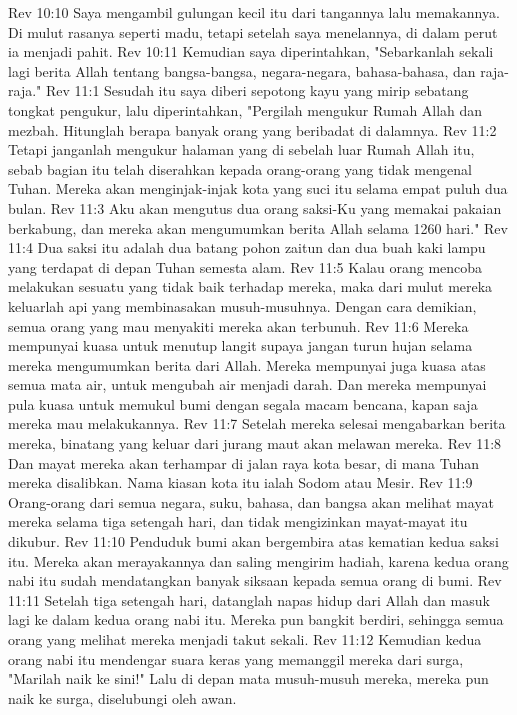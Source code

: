 Rev 10:10  Saya mengambil gulungan kecil itu dari tangannya lalu memakannya. Di mulut rasanya seperti madu, tetapi setelah saya menelannya, di dalam perut ia menjadi pahit.
Rev 10:11  Kemudian saya diperintahkan, "Sebarkanlah sekali lagi berita Allah tentang bangsa-bangsa, negara-negara, bahasa-bahasa, dan raja-raja."
Rev 11:1  Sesudah itu saya diberi sepotong kayu yang mirip sebatang tongkat pengukur, lalu diperintahkan, "Pergilah mengukur Rumah Allah dan mezbah. Hitunglah berapa banyak orang yang beribadat di dalamnya.
Rev 11:2  Tetapi janganlah mengukur halaman yang di sebelah luar Rumah Allah itu, sebab bagian itu telah diserahkan kepada orang-orang yang tidak mengenal Tuhan. Mereka akan menginjak-injak kota yang suci itu selama empat puluh dua bulan.
Rev 11:3  Aku akan mengutus dua orang saksi-Ku yang memakai pakaian berkabung, dan mereka akan mengumumkan berita Allah selama 1260 hari."
Rev 11:4  Dua saksi itu adalah dua batang pohon zaitun dan dua buah kaki lampu yang terdapat di depan Tuhan semesta alam.
Rev 11:5  Kalau orang mencoba melakukan sesuatu yang tidak baik terhadap mereka, maka dari mulut mereka keluarlah api yang membinasakan musuh-musuhnya. Dengan cara demikian, semua orang yang mau menyakiti mereka akan terbunuh.
Rev 11:6  Mereka mempunyai kuasa untuk menutup langit supaya jangan turun hujan selama mereka mengumumkan berita dari Allah. Mereka mempunyai juga kuasa atas semua mata air, untuk mengubah air menjadi darah. Dan mereka mempunyai pula kuasa untuk memukul bumi dengan segala macam bencana, kapan saja mereka mau melakukannya.
Rev 11:7  Setelah mereka selesai mengabarkan berita mereka, binatang yang keluar dari jurang maut akan melawan mereka.
Rev 11:8  Dan mayat mereka akan terhampar di jalan raya kota besar, di mana Tuhan mereka disalibkan. Nama kiasan kota itu ialah Sodom atau Mesir.
Rev 11:9  Orang-orang dari semua negara, suku, bahasa, dan bangsa akan melihat mayat mereka selama tiga setengah hari, dan tidak mengizinkan mayat-mayat itu dikubur.
Rev 11:10  Penduduk bumi akan bergembira atas kematian kedua saksi itu. Mereka akan merayakannya dan saling mengirim hadiah, karena kedua orang nabi itu sudah mendatangkan banyak siksaan kepada semua orang di bumi.
Rev 11:11  Setelah tiga setengah hari, datanglah napas hidup dari Allah dan masuk lagi ke dalam kedua orang nabi itu. Mereka pun bangkit berdiri, sehingga semua orang yang melihat mereka menjadi takut sekali.
Rev 11:12  Kemudian kedua orang nabi itu mendengar suara keras yang memanggil mereka dari surga, "Marilah naik ke sini!" Lalu di depan mata musuh-musuh mereka, mereka pun naik ke surga, diselubungi oleh awan.

